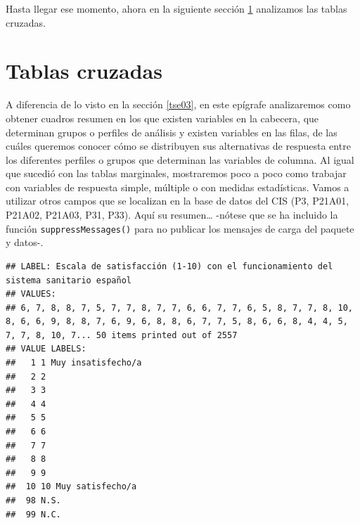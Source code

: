 \documentclass[
]{book}
\newenvironment{Shaded}{\begin{snugshade}}{\end{snugshade}}
\newcommand{\CommentTok}[1]{\textcolor[rgb]{0.56,0.35,0.01}{\textit{#1}}}
\newcommand{\FunctionTok}[1]{\textcolor[rgb]{0.00,0.00,0.00}{#1}}
\newcommand{\NormalTok}[1]{#1}
\newcommand{\OtherTok}[1]{\textcolor[rgb]{0.56,0.35,0.01}{#1}}
\newcommand{\SpecialCharTok}[1]{\textcolor[rgb]{0.00,0.00,0.00}{#1}}
\newcommand{\StringTok}[1]{\textcolor[rgb]{0.31,0.60,0.02}{#1}}
\begin{document}
Hasta llegar ese momento, ahora en la siguiente sección \ref{tse04} analizamos las tablas cruzadas.

\hypertarget{tse04}{%
\chapter{Tablas cruzadas}\label{tse04}}

A diferencia de lo visto en la sección \ref{tse03}, en este epígrafe analizaremos como obtener cuadros resumen en los que existen variables en la cabecera, que determinan grupos o perfiles de análisis y existen variables en las filas, de las cuáles queremos conocer cómo se distribuyen sus alternativas de respuesta entre los diferentes perfiles o grupos que determinan las variables de columna. Al igual que sucedió con las tablas marginales, mostraremos poco a poco como trabajar con variables de respuesta simple, múltiple o con medidas estadísticas. Vamos a utilizar otros campos que se localizan en la base de datos del CIS (P3, P21A01, P21A02, P21A03, P31, P33). Aquí su resumen\ldots{} -nótese que se ha incluido la función \texttt{suppressMessages()} para no publicar los mensajes de carga del paquete y datos-.

\begin{Shaded}
\end{Shaded}

\begin{verbatim}
## LABEL: Escala de satisfacción (1-10) con el funcionamiento del sistema sanitario español 
## VALUES:
## 6, 7, 8, 8, 7, 5, 7, 7, 8, 7, 7, 6, 6, 7, 7, 6, 5, 8, 7, 7, 8, 10, 8, 6, 6, 9, 8, 8, 7, 6, 9, 6, 8, 8, 6, 7, 7, 5, 8, 6, 6, 8, 4, 4, 5, 7, 7, 8, 10, 7... 50 items printed out of 2557 
## VALUE LABELS:                        
##   1 1 Muy insatisfecho/a
##   2 2                   
##   3 3                   
##   4 4                   
##   5 5                   
##   6 6                   
##   7 7                   
##   8 8                   
##   9 9                   
##  10 10 Muy satisfecho/a 
##  98 N.S.                
##  99 N.C.
\end{verbatim}
\end{document}
